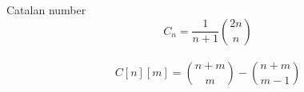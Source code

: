 Catalan number\\
\[C_n = \frac{1}{n+1}{2n \choose n} \] \\
\[C[n][m] = {n+m \choose m} - {n+m \choose m-1} \]